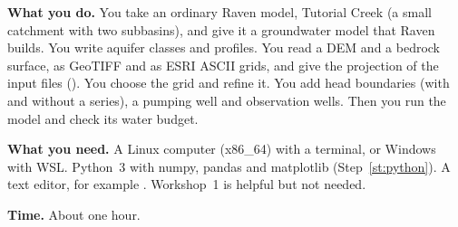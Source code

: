 \begin{goal}
\textbf{What you do.} You take an ordinary Raven model, Tutorial Creek (a small catchment with two subbasins), and give it
a groundwater model that Raven builds. You write aquifer classes and profiles. You read a DEM and a bedrock surface, as GeoTIFF
and as ESRI ASCII grids, and give the projection of the input files (). You choose the grid and refine it.
You add head boundaries (with and without a  series), a pumping well and observation wells. Then you run the
model and check its water budget.

\textbf{What you need.} A Linux computer (x86\_64) with a terminal, or Windows with WSL. Python~3 with numpy, pandas and
matplotlib (Step~\ref{st:python}). A text editor, for example . Workshop~1 is helpful but not needed.

\textbf{Time.} About one hour.
\end{goal}
